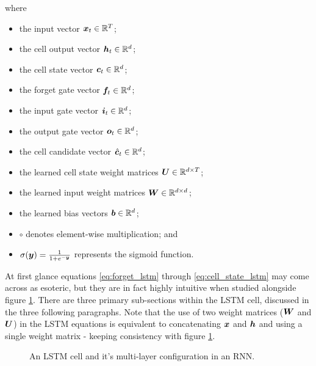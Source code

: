 where 
\begin{itemize}
	\item the input vector ${\bm{x}}_t \in \mathbb{R}^{T}$;
	\item the cell output vector ${\bm{h}}_t \in \mathbb{R}^{d}$;
	\item the cell state vector ${\bm{c}}_t \in \mathbb{R}^{d}$;
	\item  the forget gate vector ${\bm{f}}_t \in \mathbb{R}^{d}$;
	\item the input gate vector ${\bm{i}}_t \in \mathbb{R}^{d}$;
	\item the output gate vector ${\bm{o}}_t \in \mathbb{R}^{d}$;
	\item the cell candidate vector $\hat{{\bm{c}}}_t \in \mathbb{R}^{d}$;
	\item the learned cell state weight matrices ${\bm{U}} \in \mathbb{R}^{d \times T}$;
	\item the learned input weight matrices ${\bm{W}} \in \mathbb{R}^{d \times d}$;
	\item the learned bias vectors ${\bm{b}} \in \mathbb{R}^{d}$;
	\item $\circ$ denotes element-wise multiplication; and
	\item $\sigma({\bm{y}}) = \frac{1}{1 + e^{-{\bm{y}}}}$ represents the sigmoid function.
\end{itemize}

At first glance equations \ref{eq:forget_lstm} through \ref{eq:cell_state_lstm} may come across as esoteric, but they are in fact highly intuitive when studied alongside figure \ref{fig:LSTM}.
There are three primary sub-sections within the LSTM cell, discussed in the three following paragraphs.
Note that the use of two weight matrices (${\bm{W}}$ and ${\bm{U}}$) in the LSTM equations is equivalent to concatenating ${\bm{x}}$ and ${\bm{h}}$ and using a single weight matrix - keeping consistency with figure \ref{fig:LSTM}.

\begin{figure}[htbp]
	\centering
	\quad\quad
	\caption{An LSTM cell and it's multi-layer configuration in an RNN.}
	\label{fig:LSTM}
\end{figure}

